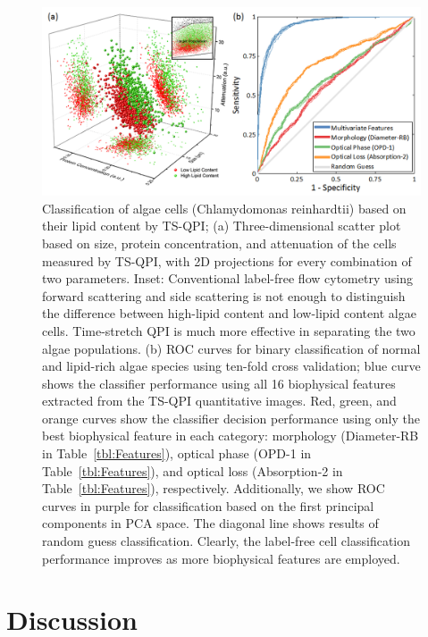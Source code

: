 \documentclass[aps,pra,reprint,longbibliography,superscriptaddress]{revtex4-1}
\begin{document}
\begin{figure}
\includegraphics[scale=0.8]{FigureAlgae.jpg}
\caption{\label{fig:AlgaeScatter} Classification of algae cells (Chlamydomonas reinhardtii) based on their lipid content by TS-QPI; (a) Three-dimensional scatter plot based on size, protein concentration, and attenuation of the cells measured by TS-QPI, with 2D projections for every combination of two parameters. Inset: Conventional label-free flow cytometry using forward scattering and side scattering is not enough to distinguish the difference between high-lipid content and low-lipid content algae cells. Time-stretch QPI is much more effective in separating the two algae populations. (b) ROC curves for binary classification of normal and lipid-rich algae species using ten-fold cross validation; blue curve shows the classifier performance using all 16 biophysical features extracted from the TS-QPI quantitative images. Red, green, and orange curves show the classifier decision performance using only the best biophysical feature in each category: morphology (Diameter-RB in Table~\ref{tbl:Features}), optical phase (OPD-1 in Table~\ref{tbl:Features}), and optical loss (Absorption-2 in Table~\ref{tbl:Features}), respectively. Additionally, we show ROC curves in purple for classification based on the first principal components in PCA space. The diagonal line shows results of random guess classification. Clearly, the label-free cell classification performance improves as more biophysical features are employed.}
\end{figure}

\section{Discussion}
\end{document}
